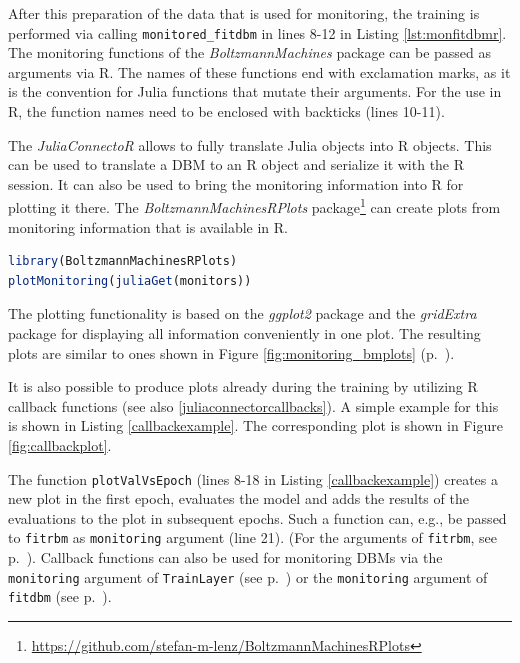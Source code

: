 \documentclass[12pt]{article}
\newcommand{\inlinecode}[1]{\texttt{#1}}
\newcommand{\apkg}[1]{\emph{#1}}
\begin{document}
After this preparation of the data that is used for monitoring, the training is performed via calling \inlinecode{monitored\_fitdbm} in lines 8-12 in Listing \ref{lst:monfitdbmr}.
The monitoring functions of the \apkg{BoltzmannMachines} package can be passed as arguments via R.
The names of these functions end with exclamation marks, as it is the convention for Julia functions that mutate their arguments.
For the use in R, the function names need to be enclosed with backticks (lines 10-11).

The \apkg{JuliaConnectoR} allows to fully translate Julia objects into R objects.
This can be used to translate a DBM to an R object and serialize it with the R session.
It can also be used to bring the monitoring information into R for plotting it there.
The \apkg{BoltzmannMachinesRPlots} package\footnote{\url{https://github.com/stefan-m-lenz/BoltzmannMachinesRPlots}} can create plots from monitoring information that is available in R.

\begin{lstlisting}[language=R, float = !h]
library(BoltzmannMachinesRPlots)
plotMonitoring(juliaGet(monitors))
\end{lstlisting}

The plotting functionality is based on the \apkg{ggplot2} package \citep{ggplot2}  and the \apkg{gridExtra} package \citep{gridExtra} for displaying all information conveniently in one plot.
The resulting plots are similar to ones shown in Figure \ref{fig:monitoring_bmplots} (p.~\pageref{fig:monitoring_bmplots}).

It is also possible to produce plots already during the training by utilizing R callback functions (see also \ref{juliaconnectorcallbacks}).
A simple example for this is shown in Listing \ref{callbackexample}.
The corresponding plot is shown in Figure \ref{fig:callbackplot}.

The function \inlinecode{plotValVsEpoch} (lines 8-18 in Listing \ref{callbackexample}) creates a new plot in the first epoch, evaluates the model and adds the results of the evaluations to the plot in subsequent epochs.
Such a function can, e.g., be passed to \inlinecode{fitrbm} as \inlinecode{monitoring} argument (line 21). (For the arguments of \inlinecode{fitrbm}, see p.~\pageref{bms_fitrbm}).
Callback functions can also be used for monitoring DBMs via the \inlinecode{monitoring} argument of \inlinecode{TrainLayer} (see p.~\pageref{bms_TrainLayer}) or the \inlinecode{monitoring} argument of \inlinecode{fitdbm} (see p.~\pageref{bms_fitdbm}).
\end{document}

